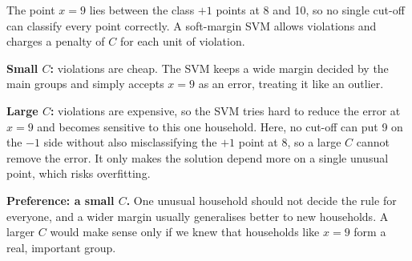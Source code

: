 The point $x = 9$ lies between the class $+1$ points at 8 and 10, so no single cut-off can
classify every point correctly. A soft-margin SVM allows violations and charges a penalty of
$C$ for each unit of violation.

\textbf{Small $C$:} violations are cheap. The SVM keeps a wide margin decided by the main
groups and simply accepts $x = 9$ as an error, treating it like an outlier.

\textbf{Large $C$:} violations are expensive, so the SVM tries hard to reduce the error at
$x = 9$ and becomes sensitive to this one household. Here, no cut-off can put 9 on the
$-1$ side without also misclassifying the $+1$ point at 8, so a large $C$ cannot remove the
error. It only makes the solution depend more on a single unusual point, which risks
overfitting.

\textbf{Preference: a small $C$.} One unusual household should not decide the rule for
everyone, and a wider margin usually generalises better to new households. A larger $C$
would make sense only if we knew that households like $x = 9$ form a real, important group.
